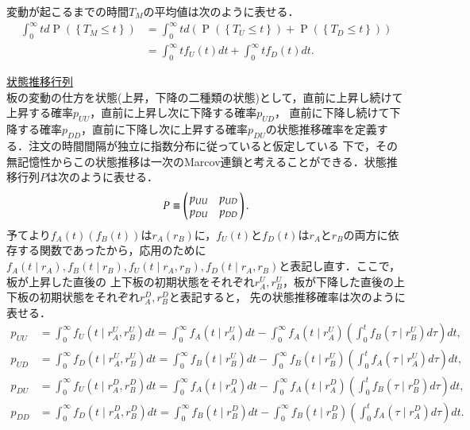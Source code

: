 \documentclass[a4j,papersize,disablejfam,slide,14pt]{jsarticle}
\def\prob#1{\operatorname{P} \left(\left\{ #1 \right\}\right)} %
\begin{document}
    変動が起こるまでの時間$T_M$の平均値は次のように表せる．
    \begin{align}
    	\int_{0}^{\infty} t d\prob{T_M \leq t} &= \int_{0}^{\infty} t d(\prob{T_U \leq t} + \prob{T_D \leq t}) \\
        &= \int_{0}^{\infty} t f_U(t) dt + \int_{0}^{\infty} t f_D(t) dt.
    \end{align}
    
\underline{\large 状態推移行列}\\
    板の変動の仕方を状態(上昇，下降の二種類の状態)として，直前に上昇し続けて上昇する確率$p_{UU}$，直前に上昇し次に下降する確率$p_{UD}$，
    直前に下降し続けて下降する確率$p_{DD}$，直前に下降し次に上昇する確率$p_{DU}$の状態推移確率を定義する．注文の時間間隔が独立に指数分布に従っていると仮定している
    下で，その無記憶性からこの状態推移は一次の{\rm Marcov}連鎖と考えることができる．状態推移行列$P$は次のように表せる．
    \begin{align}
    	P \equiv \left(
    	\begin{array}{@{\,}cc@{\,}}
    		p_{UU} & p_{UD} \\
            p_{DU} & p_{DD}
    	\end{array}
    	\right). \\
    \end{align}
    予てより$f_A(t)(f_B(t))$は$r_A(r_B)$に，$f_U(t)$と$f_D(t)$は$r_A$と$r_B$の両方に依存する関数であったから，応用のために
    $f_A(t \mid r_A), f_B(t \mid r_B), f_U(t \mid r_A, r_B), f_D(t \mid r_A, r_B)$と表記し直す．ここで，板が上昇した直後の
    上下板の初期状態をそれぞれ$r_A^U, r_B^U$，板が下降した直後の上下板の初期状態をそれぞれ$r_A^D, r_B^D$と表記すると，
    先の状態推移確率は次のように表せる．
    \begin{align}
    	p_{UU} &= \int_{0}^{\infty} f_U(t \mid r_A^U, r_B^U) dt = \int_{0}^{\infty} f_A(t \mid r_A^U)dt - \int_{0}^{\infty} f_A(t \mid r_A^U) \left( \int_{0}^{t} f_B(\tau \mid r_B^U)d\tau \right) dt, \\
        p_{UD} &= \int_{0}^{\infty} f_D(t \mid r_A^U, r_B^U) dt = \int_{0}^{\infty} f_B(t \mid r_B^U)dt - \int_{0}^{\infty} f_B(t \mid r_B^U) \left( \int_{0}^{t} f_A(\tau \mid r_A^U)d\tau \right) dt, \\
        p_{DU} &= \int_{0}^{\infty} f_U(t \mid r_A^D, r_B^D) dt = \int_{0}^{\infty} f_A(t \mid r_A^D)dt - \int_{0}^{\infty} f_A(t \mid r_A^D) \left( \int_{0}^{t} f_B(\tau \mid r_B^D)d\tau \right) dt, \\
        p_{DD} &= \int_{0}^{\infty} f_D(t \mid r_A^D, r_B^D) dt = \int_{0}^{\infty} f_B(t \mid r_B^D)dt - \int_{0}^{\infty} f_B(t \mid r_B^D) \left( \int_{0}^{t} f_A(\tau \mid r_A^D)d\tau \right) dt.
    \end{align}
\end{document}
